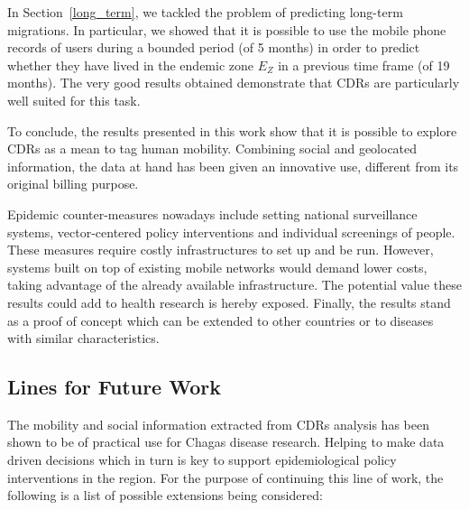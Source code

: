 In Section~\cref{long_term}, we tackled the problem of predicting long-term migrations. In particular, we showed that it is possible to use the mobile phone records of users during a bounded period (of 5 months) in order to predict whether they have lived in the endemic zone $E_Z$ in a previous time frame (of 19 months).
The very good results obtained demonstrate that CDRs are particularly well suited for this task.

To conclude, the results presented in this work show that it is possible to explore CDRs as a mean to tag human mobility. Combining social and geolocated information, the data at hand has been given an innovative use, different from its original billing purpose.

Epidemic counter-measures nowadays include setting national surveillance systems, vector-centered policy interventions and individual screenings of people. These measures require costly infrastructures to set up and be run. However, systems built on top of existing mobile networks would demand lower costs, taking advantage of the already available infrastructure. The potential value these results could add to health research is hereby exposed.
Finally, the results stand as a proof of concept which can be extended to other countries or to diseases with similar characteristics.



\subsection{Lines for Future Work}

The mobility and social information extracted from CDRs analysis has been shown to be of practical use for Chagas disease research. Helping to make data driven decisions which in turn is key to support epidemiological policy interventions in the region. For the purpose of continuing this line of work, the following is a list of possible extensions being considered:

